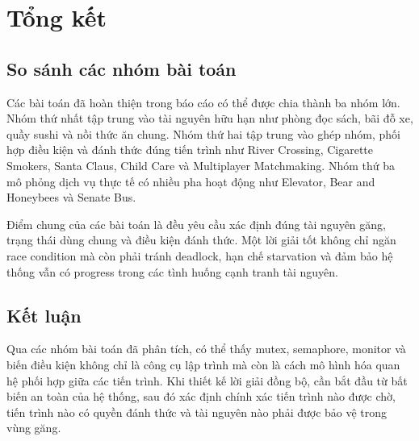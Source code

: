 \chapter{Tổng kết}

\section{So sánh các nhóm bài toán}

Các bài toán đã hoàn thiện trong báo cáo có thể được chia thành ba nhóm lớn. Nhóm thứ nhất tập trung vào tài nguyên hữu hạn như phòng đọc sách, bãi đỗ xe, quầy sushi và nồi thức ăn chung. Nhóm thứ hai tập trung vào ghép nhóm, phối hợp điều kiện và đánh thức đúng tiến trình như River Crossing, Cigarette Smokers, Santa Claus, Child Care và Multiplayer Matchmaking. Nhóm thứ ba mô phỏng dịch vụ thực tế có nhiều pha hoạt động như Elevator, Bear and Honeybees và Senate Bus.

Điểm chung của các bài toán là đều yêu cầu xác định đúng tài nguyên găng, trạng thái dùng chung và điều kiện đánh thức. Một lời giải tốt không chỉ ngăn race condition mà còn phải tránh deadlock, hạn chế starvation và đảm bảo hệ thống vẫn có progress trong các tình huống cạnh tranh tài nguyên.

\section{Kết luận}

Qua các nhóm bài toán đã phân tích, có thể thấy mutex, semaphore, monitor và biến điều kiện không chỉ là công cụ lập trình mà còn là cách mô hình hóa quan hệ phối hợp giữa các tiến trình. Khi thiết kế lời giải đồng bộ, cần bắt đầu từ bất biến an toàn của hệ thống, sau đó xác định chính xác tiến trình nào được chờ, tiến trình nào có quyền đánh thức và tài nguyên nào phải được bảo vệ trong vùng găng.
